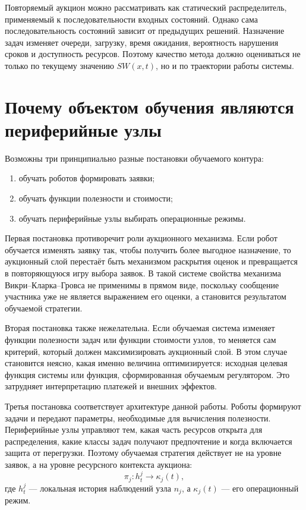 Повторяемый аукцион можно рассматривать как статический распределитель, применяемый к последовательности входных состояний. Однако сама последовательность состояний зависит от предыдущих решений. Назначение задач изменяет очереди, загрузку, время ожидания, вероятность нарушения сроков и доступность ресурсов. Поэтому качество метода должно оцениваться не только по текущему значению $SW(x,t)$, но и по траектории работы системы.

\section{Почему объектом обучения являются периферийные узлы}

Возможны три принципиально разные постановки обучаемого контура:
\begin{enumerate}
    \item обучать роботов формировать заявки;
    \item обучать функции полезности и стоимости;
    \item обучать периферийные узлы выбирать операционные режимы.
\end{enumerate}

Первая постановка противоречит роли аукционного механизма. Если робот обучается изменять заявку так, чтобы получить более выгодное назначение, то аукционный слой перестаёт быть механизмом раскрытия оценок и превращается в повторяющуюся игру выбора заявок. В такой системе свойства механизма Викри--Кларка--Гровса не применимы в прямом виде, поскольку сообщение участника уже не является выражением его оценки, а становится результатом обучаемой стратегии.

Вторая постановка также нежелательна. Если обучаемая система изменяет функции полезности задач или функции стоимости узлов, то меняется сам критерий, который должен максимизировать аукционный слой. В этом случае становится неясно, какая именно величина оптимизируется: исходная целевая функция системы или функция, сформированная обучаемым регулятором. Это затрудняет интерпретацию платежей и внешних эффектов.

Третья постановка соответствует архитектуре данной работы. Роботы формируют задачи и передают параметры, необходимые для вычисления полезности. Периферийные узлы управляют тем, какая часть ресурсов открыта для распределения, какие классы задач получают предпочтение и когда включается защита от перегрузки. Поэтому обучаемая стратегия действует не на уровне заявок, а на уровне ресурсного контекста аукциона:
\begin{equation}
    \pi_j: h^j_t \rightarrow \kappa_j(t),
    \label{eq:ch4_policy_mapping_intro}
\end{equation}
где $h^j_t$ --- локальная история наблюдений узла $n_j$, а $\kappa_j(t)$ --- его операционный режим.

